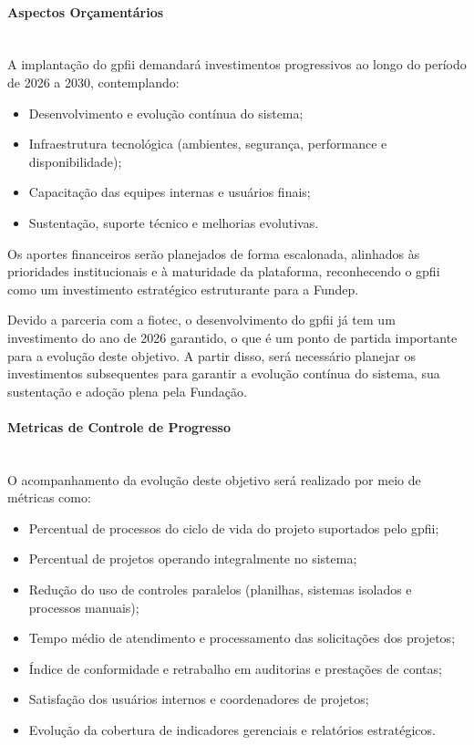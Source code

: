 \documentclass[12pt,a4paper]{article}
\begin{document}
\paragraph{Aspectos Orçamentários}\mbox{}\\
A implantação do \gls{gpfii} demandará investimentos progressivos ao longo do período de 2026 a 2030, contemplando:
\begin{itemize}
  \item Desenvolvimento e evolução contínua do sistema;
  \item Infraestrutura tecnológica (ambientes, segurança, performance e disponibilidade);
  \item Capacitação das equipes internas e usuários finais;
  \item Sustentação, suporte técnico e melhorias evolutivas.
\end{itemize}

Os aportes financeiros serão planejados de forma escalonada, alinhados às prioridades institucionais e à maturidade da plataforma, reconhecendo o \gls{gpfii} como um investimento estratégico estruturante para a Fundep.

Devido a parceria com a \gls{fiotec}, o desenvolvimento do \gls{gpfii} já tem um investimento do ano de 2026 garantido, o que é um ponto de partida importante para a evolução deste objetivo. A partir disso, será necessário planejar os investimentos subsequentes para garantir a evolução contínua do sistema, sua sustentação e adoção plena pela Fundação.

\paragraph{Metricas de Controle de Progresso}\mbox{}\\
O acompanhamento da evolução deste objetivo será realizado por meio de métricas como:
\begin{itemize}
  \item Percentual de processos do ciclo de vida do projeto suportados pelo \gls{gpfii};
  \item Percentual de projetos operando integralmente no sistema;
  \item Redução do uso de controles paralelos (planilhas, sistemas isolados e processos manuais);
  \item Tempo médio de atendimento e processamento das solicitações dos projetos;
  \item Índice de conformidade e retrabalho em auditorias e prestações de contas;
  \item Satisfação dos usuários internos e coordenadores de projetos;
  \item Evolução da cobertura de indicadores gerenciais e relatórios estratégicos.
\end{itemize}
\end{document}

